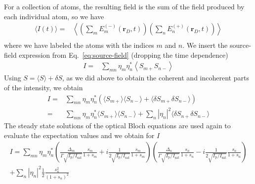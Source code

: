 \documentclass[11pt,letter]{article}
\newcommand{\bv}[1]{\ensuremath{\bm{#1}}}
\begin{document}
For a collection of atoms, the resulting field is the sum of the field produced
by each individual atom, so we have  
\begin{equation}
\begin{split}
\langle I (t) \rangle = & 
    \left\langle \left( \sum_{m} E_{m}^{(-)}(\bv{r}_{D}, t) \right)
            \left( \sum_{n} E_{n}^{(+)}(\bv{r}_{D}, t) \right) \right\rangle \\
\end{split} 
\end{equation}
where we have labeled the atoms with the indices $m$ and $n$.  We insert the
source-field expression from Eq.~\ref{eq:source-field} (dropping the time
dependence) 
\begin{equation}
\begin{split}
 I = &
    \sum_{mn}  \eta_{m}\eta_{n}^{*}  
              \left\langle S_{m+}S_{n-} \right\rangle
\end{split} 
\end{equation}
Using $S=\langle S \rangle + \delta S$, as we did above to obtain the coherent
and incoherent parts of the intensity, we obtain
\begin{equation}
\begin{split}
 I  = &
    \sum_{mn}  \eta_{m}\eta_{n}^{*} \left(
              \langle S_{m+}\rangle \langle S_{n-} \rangle  
            + \langle \delta S_{m+} \delta S_{n-} \rangle \right) \\
    = & 
    \sum_{mn}  \eta_{m}\eta_{n}^{*} 
        \langle  S_{m+}\rangle \langle S_{n-} \rangle 
   + \sum_{n} | \eta_{n}|^{2} \langle \delta S_{n+} \delta S_{n-} \rangle 
\end{split} 
\end{equation}
The steady state solutions of the optical Bloch equations are used again to
evaluate the expectation values and we obtain for $I$
\begin{multline}
 I = 
  \sum_{mn}  \eta_{m}\eta_{n}^{*}
    \left(
    \frac{ \Delta_{m} }{ \Gamma  \sqrt{ I_{\mathrm{p}} / I_{\mathrm{sat}}} } 
    \frac{s_{m}}{ 1 + s_{m} } 
   + i 
    \frac{ 1 } { 2 \sqrt{ I_{\mathrm{p}} / I_{\mathrm{sat}}} } 
    \frac{s_{m}}{1+s_{m}} 
    \right) 
    \left(
    \frac{ \Delta_{n} }{ \Gamma  \sqrt{ I_{\mathrm{p}} / I_{\mathrm{sat}}} } 
    \frac{s_{n}}{ 1 + s_{n} } 
   - i 
    \frac{ 1 } { 2 \sqrt{ I_{\mathrm{p}} / I_{\mathrm{sat}}} } 
    \frac{s_{n}}{1+s_{n}} 
    \right) \\
   + \sum_{n} | \eta_{n}|^{2} \frac{1}{2} \frac{ s_{n}^{2} } 
                                               { (1 + s _{n} )^{2} } 
\end{multline}
\end{document}
